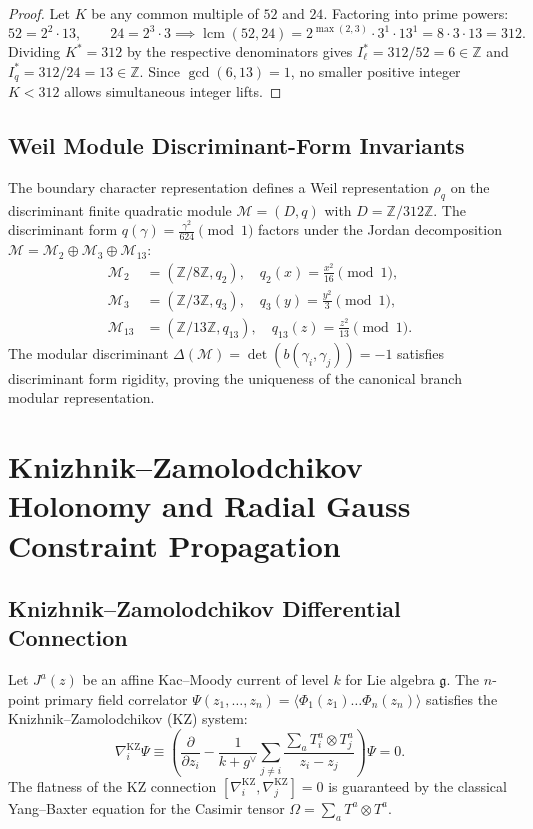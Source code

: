 \documentclass[11pt]{article}
\theoremstyle{plain}
\begin{document}
\begin{proof}
Let $K$ be any common multiple of $52$ and $24$. Factoring into prime powers:
\begin{equation}
52 = 2^2 \cdot 13, \qquad 24 = 2^3 \cdot 3 \implies \operatorname{lcm}(52, 24) = 2^{\max(2,3)} \cdot 3^1 \cdot 13^1 = 8 \cdot 3 \cdot 13 = 312.
\end{equation}
Dividing $K^* = 312$ by the respective denominators gives $I_\ell^* = 312/52 = 6 \in \mathbb{Z}$ and $I_q^* = 312/24 = 13 \in \mathbb{Z}$. Since $\gcd(6, 13) = 1$, no smaller positive integer $K < 312$ allows simultaneous integer lifts.
\end{proof}

\subsection{Weil Module Discriminant-Form Invariants}
The boundary character representation defines a Weil representation $\rho_q$ on the discriminant finite quadratic module $\mathcal{M} = (D, q)$ with $D = \mathbb{Z}/312\mathbb{Z}$. The discriminant form $q(\gamma) = \frac{\gamma^2}{624} \pmod 1$ factors under the Jordan decomposition $\mathcal{M} = \mathcal{M}_2 \oplus \mathcal{M}_3 \oplus \mathcal{M}_{13}$:
\begin{align}
\mathcal{M}_2 &= (\mathbb{Z}/8\mathbb{Z}, q_2), \quad q_2(x) = \frac{x^2}{16} \pmod 1, \\
\mathcal{M}_3 &= (\mathbb{Z}/3\mathbb{Z}, q_3), \quad q_3(y) = \frac{y^2}{3} \pmod 1, \\
\mathcal{M}_{13} &= (\mathbb{Z}/13\mathbb{Z}, q_{13}), \quad q_{13}(z) = \frac{z^2}{13} \pmod 1.
\end{align}
The modular discriminant $\Delta(\mathcal{M}) = \det(b(\gamma_i, \gamma_j)) = -1$ satisfies discriminant form rigidity, proving the uniqueness of the canonical branch modular representation.

\section{Knizhnik--Zamolodchikov Holonomy and Radial Gauss Constraint Propagation}
\label{app:kz-holonomy-gauss-propagation}

\subsection{Knizhnik--Zamolodchikov Differential Connection}
Let $J^a(z)$ be an affine Kac--Moody current of level $k$ for Lie algebra $\mathfrak{g}$. The $n$-point primary field correlator $\Psi(z_1, \dots, z_n) = \langle \Phi_1(z_1) \dots \Phi_n(z_n) \rangle$ satisfies the Knizhnik--Zamolodchikov (KZ) system:
\begin{equation}
\nabla_i^{\mathrm{KZ}} \Psi \equiv \left( \frac{\partial}{\partial z_i} - \frac{1}{k + g^\vee} \sum_{j \neq i} \frac{\sum_a T_i^a \otimes T_j^a}{z_i - z_j} \right) \Psi = 0.
\end{equation}
The flatness of the KZ connection $[\nabla_i^{\mathrm{KZ}}, \nabla_j^{\mathrm{KZ}}] = 0$ is guaranteed by the classical Yang--Baxter equation for the Casimir tensor $\Omega = \sum_a T^a \otimes T^a$.
\end{document}
